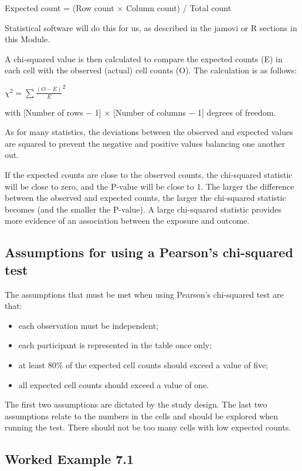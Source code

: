 \documentclass[
  a4paper,
]{memoir}
\providecommand{\tightlist}{%
  \setlength{\itemsep}{0pt}\setlength{\parskip}{0pt}}
\begin{document}
Expected count = (Row count × Column count) / Total count

Statistical software will do this for us, as described in the jamovi or
R sections in this Module.

A chi-squared value is then calculated to compare the expected counts
(E) in each cell with the observed (actual) cell counts (O). The
calculation is as follows:

\(\chi ^ 2 = \sum \frac{(O - E)}{E} ^2\)

with {[}Number of rows \(-\) 1{]} \(\times\) {[}Number of columns \(-\)
1{]} degrees of freedom.

As for many statistics, the deviations between the observed and expected
values are squared to prevent the negative and positive values balancing
one another out.

If the expected counts are close to the observed counts, the chi-squared
statistic will be close to zero, and the P-value will be close to 1. The
larger the difference between the observed and expected counts, the
larger the chi-squared statistic becomes (and the smaller the P-value).
A large chi-squared statistic provides more evidence of an association
between the exposure and outcome.

\subsection{Assumptions for using a Pearson's chi-squared
test}\label{assumptions-for-using-a-pearsons-chi-squared-test}

The assumptions that must be met when using Pearson's chi-squared test
are that:

\begin{itemize}
\tightlist
\item
  each observation must be independent;
\item
  each participant is represented in the table once only;
\item
  at least 80\% of the expected cell counts should exceed a value of
  five;
\item
  all expected cell counts should exceed a value of one.
\end{itemize}

The first two assumptions are dictated by the study design. The last two
assumptions relate to the numbers in the cells and should be explored
when running the test. There should not be too many cells with low
expected counts.

\subsection{Worked Example 7.1}\label{worked-example-7.1}
\end{document}
